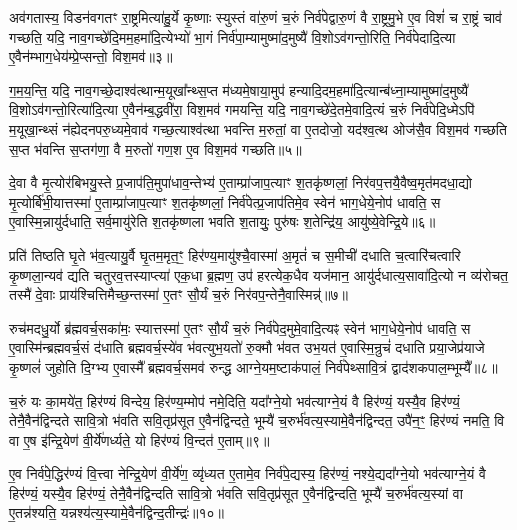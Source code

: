 अव॑गतास्य॒ विडन॑वगतꣳ रा॒ष्ट्रमित्या॑हु॒र्ये कृ॒ष्णाः स्युस्तं वा॑रु॒णं च॒रुं निर्व॑पेद्वारु॒णं वै रा॒ष्ट्रमु॒भे ए॒व विशं॑ च रा॒ष्ट्रं चाव॑ गच्छति॒ यदि॒ नाव॒गच्छे॑दि॒मम॒हमा॑दि॒त्येभ्यो॑ भा॒गं निर्व॑पा॒म्यामुष्मा॑द॒मुष्यै॑ वि॒शो\-ऽव॑गन्तो॒रिति॒ निर्व॑पेदादि॒त्या ए॒वैन॑म्भाग॒धेय॑म्प्रे॒प्सन्तो॒ विश॒मव॑॥३॥

ग॒म॒य॒न्ति॒ यदि॒ नाव॒गच्छे॒दाश्व॑त्थान्म॒यूखा᳚न्थ्स॒प्त म॑ध्यमे॒षाया॒मुप॑ हन्यादि॒दम॒हमा॑दि॒त्यान्ब॑ध्ना॒म्यामुष्मा॑द॒मुष्यै॑ वि॒शो\-ऽव॑गन्तो॒रित्या॑दि॒त्या ए॒वैन॑म्ब॒द्धवी॑रा॒ विश॒मव॑ गमयन्ति॒ यदि॒ नाव॒गच्छे॑दे॒तमे॒वादि॒त्यं च॒रुं निर्व॑पेदि॒ध्मे\-ऽपि॑ म॒यूखा॒न्थ्सं न॑ह्येदनपरु॒ध्यमे॒वाव॑ गच्छ॒त्याश्व॑त्था भवन्ति म॒रुतां॒ वा ए॒तदोजो॒ यद॑श्व॒त्थ ओज॑सै॒व विश॒मव॑ गच्छति स॒प्त भ॑वन्ति स॒प्तग॑णा॒ वै म॒रुतो॑ गण॒श ए॒व विश॒मव॑ गच्छति॥५॥

{\anuvakamend[{धा॒रय॑द्वतो मरुतो गच्छति॒ विश॒मवै॒तद॒ष्टाद॑श च॥१॥}]}

दे॒वा वै मृ॒त्योर॑बिभयु॒स्ते प्र॒जाप॑ति॒मुपा॑धाव॒न्तेभ्य॑ ए॒ताम्प्रा॑जाप॒त्याꣳ श॒तकृ॑ष्णलां॒ निर॑वप॒त्तयै॒वैष्व॒मृत॑मदधा॒द्यो मृ॒त्योर्बि॑भी॒यात्तस्मा॑ ए॒ताम्प्रा॑जाप॒त्याꣳ श॒तकृ॑ष्णलां॒ निर्व॑पेत्प्र॒जाप॑तिमे॒व स्वेन॑ भाग॒धेये॒नोप॑ धावति॒ स ए॒वास्मि॒न्नायु॑र्दधाति॒ सर्व॒मायु॑रेति श॒तकृ॑ष्णला भवति श॒तायुः॒ पुरु॑षः श॒तेन्द्रि॑य॒ आयु॑ष्ये॒वेन्द्रि॒ये॥६॥

प्रति॑ तिष्ठति घृ॒ते भ॑व॒त्यायु॒र्वै घृ॒तम॒मृत॒ꣳ॒ हिर॑ण्य॒मायु॑श्चै॒वास्मा॑ अ॒मृतं॑ च स॒मीची॑ दधाति च॒त्वारि॑चत्वारि कृ॒ष्णला॒न्यव॑ द्यति चतुरव॒त्तस्याप्त्या॑ एक॒धा ब्र॒ह्मण॒ उप॑ हरत्येक॒धैव यज॑मान॒ आयु॑र्दधात्य॒सावा॑दि॒त्यो न व्य॑रोचत॒ तस्मै॑ दे॒वाः प्राय॑श्चित्तिमैच्छ॒न्तस्मा॑ ए॒तꣳ सौ॒र्यं च॒रुं निर॑वप॒न्तेनै॒वास्मिन्न्॑॥७॥

रुच॑मदधु॒र्यो ब्र॑ह्मवर्च॒सका॑मः॒ स्यात्तस्मा॑ ए॒तꣳ सौ॒र्यं च॒रुं निर्व॑पेद॒मुमे॒वादि॒त्यꣴ स्वेन॑ भाग॒धेये॒नोप॑ धावति॒ स ए॒वास्मि॑न्ब्रह्मवर्च॒सं द॑धाति ब्रह्मवर्च॒स्ये॑व भ॑वत्युभ॒यतो॑ रु॒क्मौ भ॑वत उभ॒यत॑ ए॒वास्मि॒न्रुचं॑ दधाति प्रया॒जेप्र॑याजे कृ॒ष्णलं॑ जुहोति दि॒ग्भ्य ए॒वास्मै᳚ ब्रह्मवर्च॒समव॑ रुन्द्ध आग्ने॒यम॒ष्टाक॑पालं॒ निर्व॑पेथ्सावि॒त्रं द्वाद॑शकपाल॒म्भूम्यै᳚॥८॥

च॒रुं यः का॒मये॑त॒ हिर॑ण्यं विन्देय॒ हिर॑ण्य॒म्मोप॑ नमे॒दिति॒ यदा᳚ग्ने॒यो भव॑त्याग्ने॒यं वै हिर॑ण्यं॒ यस्यै॒व हिर॑ण्यं॒ तेनै॒वैन॑द्विन्दते सावि॒त्रो भ॑वति सवि॒तृप्र॑सूत ए॒वैन॑द्विन्दते॒ भूम्यै॑ च॒रुर्भ॑वत्य॒स्यामे॒वैन॑द्विन्दत॒ उपै॑न॒ꣳ॒ हिर॑ण्यं नमति॒ वि वा ए॒ष इ॑न्द्रि॒येण॑ वी॒र्ये॑णर्ध्यते॒ यो हिर॑ण्यं वि॒न्दत॑ ए॒ताम्॥९॥

ए॒व निर्व॑पे॒द्धिर॑ण्यं वि॒त्त्वा नेन्द्रि॒येण॑ वी॒र्ये॑ण॒ व्यृ॑ध्यत ए॒तामे॒व निर्व॑पे॒द्यस्य॒ हिर॑ण्यं॒ नश्ये॒द्यदा᳚ग्ने॒यो भव॑त्याग्ने॒यं वै हिर॑ण्यं॒ यस्यै॒व हिर॑ण्यं॒ तेनै॒वैन॑द्विन्दति सावि॒त्रो भ॑वति सवि॒तृप्र॑सूत ए॒वैन॑द्विन्दति॒ भूम्यै॑ च॒रुर्भ॑वत्य॒स्यां वा ए॒तन्न॑श्यति॒ यन्नश्य॑त्य॒स्यामे॒वैन॑द्विन्द॒तीन्द्रः॑॥१०॥

